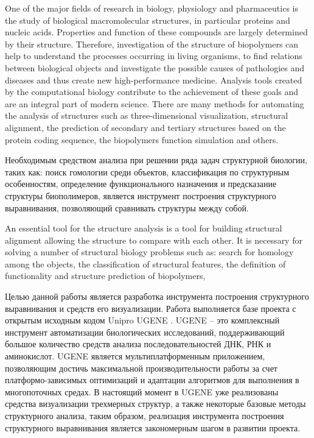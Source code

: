 \documentclass[a4paper, 12pt, titlepage, utf8]{extarticle}
\begin{document}
One of the major fields of research in biology, physiology and pharmaceutics is
the study of biological macromolecular structures, in particular proteins and
nucleic acids. Properties and function of these compounds are largely determined
by their structure. Therefore, investigation of the structure of biopolymers can
help to understand the processes occurring in living organisms, to find
relations between biological objects and investigate the possible causes of
pathologies and diseases and thus create new high-performance medicine. Analysis
tools created by the computational biology contribute to the achievement of
these goals and are an integral part of modern science. There are many methods
for automating the analysis of structures such as three-dimensional
visualization, structural alignment, the prediction of secondary and tertiary
structures based on the protein coding sequence, the biopolymers function
simulation and others.

\begin{original}
Необходимым средством анализа при решении ряда задач структурной биологии, таких
как: поиск гомологии среди объектов, классификация по структурным особенностям,
определение функционального назначения и предсказание структуры биополимеров,
является инструмент построения структурного выравнивания, позволяющий сравнивать
структуры между собой.
\end{original}

An essential tool for the structure analysis is a tool for building structural
alignment allowing the structure to compare with each other. It is necessary
for solving a number of structural biology problems such as: search for homology
among the objects, the classification of structural features, the definition of
functionality and structure prediction of biopolymers,

\begin{original}
Целью данной работы является разработка инструмента построения структурного
выравнивания и средств его визуализации. Работа выполняется базе проекта с
открытым исходным кодом Unipro UGENE \cite{ugene}. UGENE -- это комплексный
инструмент автоматизации биологических исследований, поддерживающий большое
количество средств анализа последовательностей ДНК, РНК и аминокислот. UGENE
является мультиплатформенным приложением, позволяющим достичь максимальной
производительности работы за счет платформо-зависимых оптимизаций и адаптации
алгоритмов для выполнения в многопоточных средах. В настоящий момент в UGENE уже
реализованы средства визуализации трехмерных структур, а также некоторые базовые
методы структурного анализа, таким образом, реализация инструмента построения
структурного выравнивания является закономерным шагом в развитии проекта.
\end{original}
\end{document}
